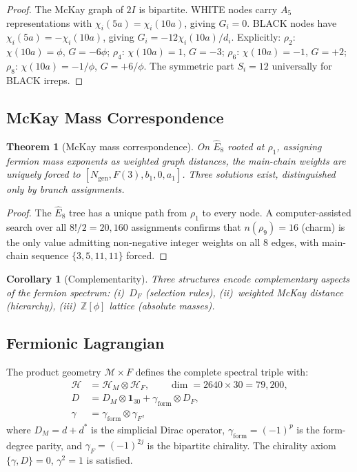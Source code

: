 \documentclass[12pt,a4paper]{article}
\newtheorem{theorem}{Theorem}
\newtheorem{corollary}{Corollary}
\theoremstyle{definition}
\begin{document}
\begin{proof}
The McKay graph of $2I$ is bipartite.  WHITE nodes carry $A_5$ representations with $\chi_i(5a) = \chi_i(10a)$, giving $G_i = 0$.  BLACK nodes have $\chi_i(5a) = -\chi_i(10a)$, giving $G_i = -12\chi_i(10a)/d_i$.
Explicitly:
$\rho_2$: $\chi(10a) = \phi$, $G = -6\phi$;
$\rho_4$: $\chi(10a) = 1$, $G = -3$;
$\rho_6$: $\chi(10a) = -1$, $G = +2$;
$\rho_8$: $\chi(10a) = -1/\phi$, $G = +6/\phi$.
The symmetric part $S_i = 12$ universally for BLACK irreps.
\end{proof}

\subsection{McKay Mass Correspondence}

\begin{theorem}[McKay mass correspondence]\label{thm:S-mckay-mass}
On $\hat{E}_8$ rooted at $\rho_1$, assigning fermion mass exponents as weighted graph distances, the main-chain weights are uniquely forced to $[N_{\mathrm{gen}}, F(3), b_1, 0, a_1]$.  Three solutions exist, distinguished only by branch assignments.
\end{theorem}

\begin{proof}
The $\hat{E}_8$ tree has a unique path from $\rho_1$ to every node.  A computer-assisted search over all $8!/2 = 20{,}160$ assignments confirms that $n(\rho_9) = 16$ (charm) is the only value admitting non-negative integer weights on all 8 edges, with main-chain sequence $\{3, 5, 11, 11\}$ forced.
\end{proof}

\begin{corollary}[Complementarity]\label{cor:S-complementarity}
Three structures encode complementary aspects of the fermion spectrum: (i)~$D_F$ (selection rules), (ii)~weighted McKay distance (hierarchy), (iii)~$\mathbb{Z}[\phi]$ lattice (absolute masses).
\end{corollary}

\subsection{Fermionic Lagrangian}

The product geometry $\mathcal{M} \times F$ defines the complete spectral triple with:
\begin{align}
\mathcal{H} &= \mathcal{H}_M \otimes \mathcal{H}_F, \qquad \dim = 2640 \times 30 = 79{,}200, \\
D &= D_M \otimes \mathbf{1}_{30} + \gamma_{\mathrm{form}} \otimes D_F, \\
\gamma &= \gamma_{\mathrm{form}} \otimes \gamma_F,
\end{align}
where $D_M = d + d^*$ is the simplicial Dirac operator, $\gamma_{\mathrm{form}} = (-1)^p$ is the form-degree parity, and $\gamma_F = (-1)^{2j}$ is the bipartite chirality.  The chirality axiom $\{\gamma, D\} = 0$, $\gamma^2 = 1$ is satisfied.
\end{document}
